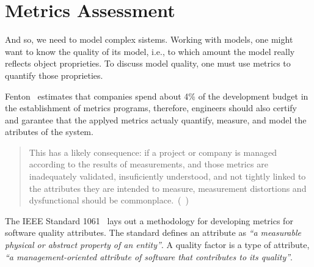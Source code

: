 \section{Metrics Assessment} \label{assess}






\begin{comment}
Effective management of any process requires quantification, measurement, and modeling. Software metrics provide a quantitative basis for the development and validation of models of the software development process. Metrics can be used to improve software productivity and quality.~(\cite{g1:Millis:1998}~)
\end{comment}


\indent
\par And so, we need to model complex sistems. Working with models, one might want to know the quality of its model, i.e., to which amount the model really reflects object proprieties. To discuss model quality, one must use metrics to quantify those proprieties.

\par Fenton~\cite{g1:Fenton:1999} estimates that companies spend about 4\% of the development budget in the establishment of metrics programs, therefore, engineers should also certify and garantee that the applyed metrics actualy quantify, measure, and model the atributes of the system.
\begin{quotation}
	This has a likely consequence: if a project or company is managed according to the results of measurements, and those metrics are inadequately validated, insuficiently understood, and not tightly linked to the attributes they are intended to measure, measurement distortions and dysfunctional should be commonplace.~(\cite{g1:kaner:2004}~)
\end{quotation}


\par The IEEE Standard 1061~\cite{g1:Ieee1061:1998} lays out a methodology for developing metrics for software quality attributes. The standard defines an attribute as \emph{``a measurable physical or abstract property of an entity''}. A quality factor is a type of attribute, \emph{``a management-oriented attribute of software that contributes to its quality''}.

